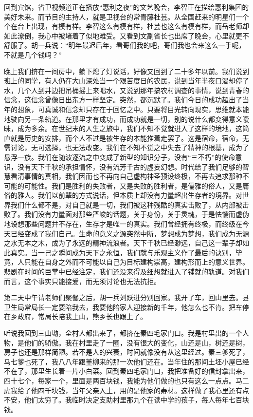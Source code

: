 \documentclass[12pt,oneside]{book}
\begin{document}
回到宾馆，省卫视频道正在播放``惠利之夜''的文艺晚会，李智正在描绘惠利集团的美好未来。而节目的主持人，就是卫视台的常青藤杜芸。从全国赶来的明星们一个个在台上出现，有模有样。李智这么有模有样，杜芸也这么有模有样，而岳老师却如此潦倒，我心中被堵着了似地难受。又看到文副省长也出席了晚会，心里就更不舒服了。胡一兵说：``明年最迟后年，看哥们我的吧，哥们我也会来这么一手呢，不就是几个钱吗？''

晚上我们挤在一间房中，躺下熄了灯说话，好像又回到了二十多年以前。我们说到班上的同学，有人仍在大山深处当一个艰苦度日的农民，说到当年半夜口渴却停了水，几个人到井边把吊桶摇上来喝水，又说到那年搞农村调查的事情，说到青春的信念，这信念曾像日出东方一样坚定。突然，都沉默了。我们今日的成功超出了当年的想象，可真诚和信念却只存在于回忆之中。只要将目光转向现实，思维就本能地驶向另一条轨道。在那里才有成功，而成功就是一切，别的说什么都变得意义暧昧，成为多余。在世纪末的人生之旅中，我们不知不觉就进入了这样的境地，这简直就是历史的安排，而个人不过是被生存的本能推着走罢了。这是宿命，宿命，无需讨论，无可选择，也无法改变。我们在不知不觉之中失去了精神的根基，成为了悬浮一族。我们在随波逐流之中变成了新型的知识分子，没有``三不朽''的使命意识，没有天下千秋的承担情怀，没有流芳千古的虚妄幻想。时代给了我们足够的智慧看清事情的真相，我们因而也不再向自己虚构神圣预设终极，不再去追求那种不可能的可能性。我们是胜利的失败者，又是失败的胜利者，是儒雅的俗人，又是庸俗的雅人。我们以前辈的方式说话，但本质上却没有力量超出生存者的境界。对世界我们什么都不是，对自己就是一切，我们被这种残酷的真实击败了，从内部被击败了。我们没有力量面对那些严峻的话题，关于身份，关于灵魂，于是怯懦而虚伪地设想那些问题并不存在，生存才是唯一的真实。我们曾经拥有终极，而终级在今天已经变成了我们自己。生命的意义之源突然中断，梦想成为梦想，我们成为无源之水无本之木，成为了永远的精神流浪者。天下千秋已经渺远，自己这一辈子却如此真实。当一己之瞬间成为天下之永恒，我们就与乐观主义作了最后的诀别，毕竟，人只能在自身之外而不可能以自己为目标建构崇高，建构形而上的意义世界。悲剧在时间的巨掌中已经注定，我们还没来得及细想就进入了铺就的轨道。对我们而言，这个事实只能接爱，而无须讨论也无法抗拒。

第二天中午请老师们聚餐之后，胡一兵刘跃进分别回家。我开了车，回山里去。县卫生局常局长一定要陪我去，我要他陪家人迎接新的千年，他怎么也不肯。把车停在乡政府，常局长陪我上山，熊乡长也跟上了。

听说我回到三山坳，全村人都出来了，都挤在秦四毛家门口。我是村里出的一个人物，是他们的骄傲。我在村里走了一圈，没有很大的变化，山还是山，树还是树，房子也还是那样简陋。若不是人的兴衰，时间就像没有从这里经过。秦三爹死了，马七爹也死了，我八八年跟董柳来的那一次他们还在。当年住的那间土坯小屋已经不在了，那里生长着一片小白菜。回到秦四毛家门口，我把准备好的信封拿出来，四十七个，每家一个，里面是两百块钱，我能为他们做的也只有这么一点点。马二虎我给了他四千块钱，当年父亲入土，用的是他家的寿材。这样做了我心里还有点不安，他们太穷了。我临时决定支助村里那九个在读中学的孩子，每人每年七百块钱。
\end{document}
